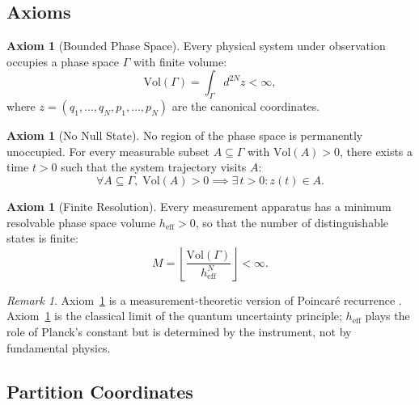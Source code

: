 \documentclass[11pt,twocolumn,a4paper]{article}
\theoremstyle{definition}
\newtheorem{axiom}[theorem]{Axiom}
\theoremstyle{remark}
\newtheorem{remark}[theorem]{Remark}
\begin{document}
\subsection{Axioms}

\begin{axiom}[Bounded Phase Space]\label{ax:bounded}
Every physical system under observation occupies a phase space $\Gamma$ with finite volume:
\begin{equation}\label{eq:bounded-phase}
    \mathrm{Vol}(\Gamma) = \int_{\Gamma} d^{2N}z < \infty,
\end{equation}
where $z = (q_1, \ldots, q_N, p_1, \ldots, p_N)$ are the canonical coordinates.
\end{axiom}

\begin{axiom}[No Null State]\label{ax:no-null}
No region of the phase space is permanently unoccupied.  For every measurable subset $A \subseteq \Gamma$ with $\mathrm{Vol}(A) > 0$, there exists a time $t > 0$ such that the system trajectory visits $A$:
\begin{equation}\label{eq:no-null}
    \forall A \subseteq \Gamma,\; \mathrm{Vol}(A) > 0 \implies \exists\, t > 0 : z(t) \in A.
\end{equation}
\end{axiom}

\begin{axiom}[Finite Resolution]\label{ax:finite-resolution}
Every measurement apparatus has a minimum resolvable phase space volume $h_{\mathrm{eff}} > 0$, so that the number of distinguishable states is finite:
\begin{equation}\label{eq:finite-resolution}
    M = \left\lfloor \frac{\mathrm{Vol}(\Gamma)}{h_{\mathrm{eff}}^N} \right\rfloor < \infty.
\end{equation}
\end{axiom}

\begin{remark}
Axiom~\ref{ax:no-null} is a measurement-theoretic version of Poincar\'{e} recurrence \citep{poincare1890probleme}.  Axiom~\ref{ax:finite-resolution} is the classical limit of the quantum uncertainty principle; $h_{\mathrm{eff}}$ plays the role of Planck's constant but is determined by the instrument, not by fundamental physics.
\end{remark}

\subsection{Partition Coordinates}
\end{document}
